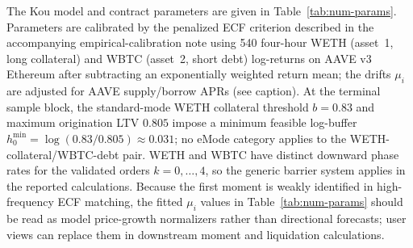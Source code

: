 The Kou model and contract parameters are given in Table~\ref{tab:num-params}.
Parameters are calibrated by the penalized ECF criterion described in the accompanying
empirical-calibration note
using 540 four-hour WETH (asset~1, long collateral) and
WBTC (asset~2, short debt) log-returns on AAVE v3 Ethereum after subtracting an exponentially
weighted return mean; the drifts $\mu_i$ are adjusted for AAVE supply/borrow
APRs (see caption). At the terminal sample block, the standard-mode WETH collateral
threshold $b=0.83$ and maximum origination LTV $0.805$ impose a minimum feasible
log-buffer $h_0^{\min}=\log(0.83/0.805)\approx0.031$; no eMode category applies to
the WETH-collateral/WBTC-debt pair. WETH and WBTC have distinct downward phase rates for the validated orders
$k=0,\ldots,4$, so the generic barrier system applies in the reported calculations.
Because the first moment is weakly identified in high-frequency ECF matching,
the fitted $\mu_i$ values in Table~\ref{tab:num-params} should be read as model
price-growth normalizers rather than directional forecasts; user views can replace
them in downstream moment and liquidation calculations.

